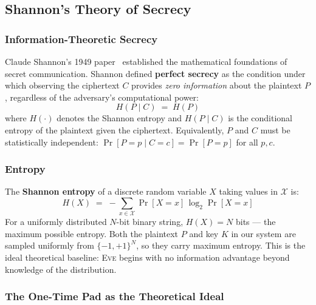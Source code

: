 \documentclass[12pt, a4paper]{article}
\newcommand{\eve}{\textsc{Eve}}
\begin{document}
\subsection{Shannon's Theory of Secrecy}
\label{subsec:shannon}

\subsubsection*{Information-Theoretic Secrecy}

Claude Shannon's 1949 paper~\cite{shannon1949communication} established
the mathematical foundations of secret communication. Shannon defined
\textbf{perfect secrecy} as the condition under which observing the
ciphertext $C$ provides \emph{zero information} about the plaintext $P$,
regardless of the adversary's computational power:
%
\begin{equation}
  H(P \mid C) \;=\; H(P)
  \label{eq:perfect_secrecy}
\end{equation}
%
where $H(\cdot)$ denotes the Shannon entropy and $H(P \mid C)$ is the
conditional entropy of the plaintext given the ciphertext. Equivalently,
$P$ and $C$ must be statistically independent:
$\Pr[P = p \mid C = c] = \Pr[P = p]$ for all $p, c$.

\subsubsection*{Entropy}

The \textbf{Shannon entropy} of a discrete random variable $X$ taking
values in $\mathcal{X}$ is:
%
\begin{equation}
  H(X) \;=\; -\sum_{x \in \mathcal{X}} \Pr[X=x]\,\log_2 \Pr[X=x]
  \label{eq:entropy}
\end{equation}
%
For a uniformly distributed $N$-bit binary string, $H(X) = N$ bits — the
maximum possible entropy. Both the plaintext $P$ and key $K$ in our system
are sampled uniformly from $\{-1,+1\}^N$, so they carry maximum entropy.
This is the ideal theoretical baseline: \eve{} begins with no information
advantage beyond knowledge of the distribution.

\subsubsection*{The One-Time Pad as the Theoretical Ideal}
\end{document}
